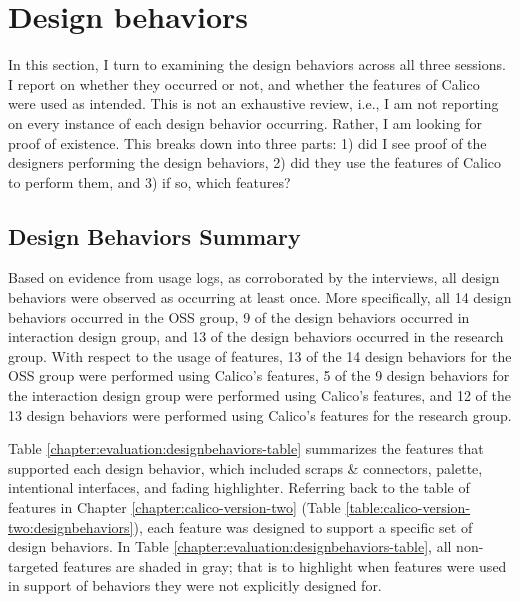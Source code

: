 
\section{Design behaviors}
\label{chapter:evaluation:design-behaviors}
In this section, I turn to examining the design behaviors across all three sessions. I report on whether they occurred or not, and whether the features of Calico were used as intended. This is not an exhaustive review, i.e., I am not reporting on every instance of each design behavior occurring. Rather, I am looking for proof of existence. This breaks down into three parts: 1) did I see proof of the designers performing the design behaviors, 2) did they use the features of Calico to perform them, and 3) if so, which features?


\subsection{Design Behaviors Summary}

Based on evidence from usage logs, as corroborated by the interviews, all design behaviors were observed as occurring at least once. More specifically, all 14 design behaviors occurred in the OSS group, 9 of the design behaviors occurred in interaction design group, and 13 of the design behaviors occurred in the research group. With respect to the usage of features, 13 of the 14 design behaviors for the OSS group were performed using Calico's features, 5 of the 9 design behaviors for the interaction design group were performed using Calico's features, and 12 of the 13 design behaviors were performed using Calico's features for the research group.

Table \ref{chapter:evaluation:designbehaviors-table} summarizes the features that supported each design behavior, which included scraps \& connectors, palette, intentional interfaces, and fading highlighter. Referring back to the table of features in Chapter \ref{chapter:calico-version-two} (Table \ref{table:calico-version-two:designbehaviors}), each feature was designed to support a specific set of design behaviors. In Table \ref{chapter:evaluation:designbehaviors-table}, all non-targeted features are shaded in gray; that is to highlight when features were used in support of behaviors they were not explicitly designed for.

